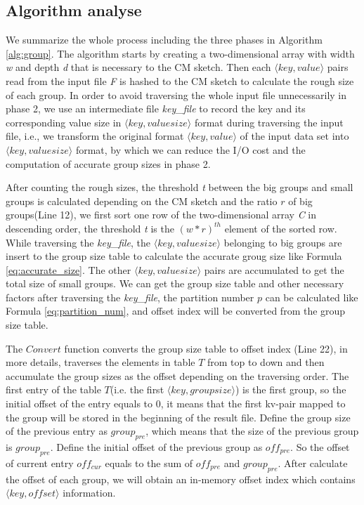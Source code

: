 \subsection{Algorithm analyse}
We summarize the whole process including the three phases in Algorithm \ref{alg:group}. The algorithm starts by creating a two-dimensional array with width \emph{w} and depth \emph{d} that is necessary to the CM sketch. Then each $\langle key, value\rangle$ pairs read from the input file \emph{F} is hashed to the CM sketch to calculate the rough size of each group. In order to avoid traversing the whole input file unnecessarily in phase 2, we use an intermediate file \emph{key\_file} to record the key and its corresponding value size in $\langle key, valuesize\rangle$ format during traversing the input file, i.e., we transform the original format $\langle key, value\rangle$ of the input data set into $\langle key, valuesize\rangle$ format, by which we can reduce the I/O cost and the computation of accurate group sizes in phase 2.

After counting the rough sizes, the threshold \emph{t} between the big groups and small groups is calculated depending on the CM sketch and the ratio $r$ of big groups(Line 12), we first sort one row of the two-dimensional array \emph{C} in descending order, the threshold \emph{t} is the ${(w*r)}^{th}$ element of the sorted row. While traversing the \emph{key\_file}, the $\langle key, valuesize\rangle$ belonging to big groups are insert to the group size table to calculate the accurate groug size like Formula \ref{eq:accurate_size}. The other $\langle key, valuesize\rangle$ pairs are accumulated to get the total size of small groups. We can get the group size table and other necessary factors after traversing the \emph{key\_file}, the partition number $p$ can be calculated like Formula \ref{eq:partition_num}, and offset index will be converted from the group size table.

The $Convert$ function converts the group size table to offset index (Line 22), in more details, traverses the elements in table $T$ from top to down and then accumulate the group sizes as the offset depending on the traversing order. The first entry of the table $T$(i.e. the first $\langle key, groupsize\rangle$) is the first group, so the initial offset of the entry equals to 0, it means that the first kv-pair mapped to the group will be stored in the beginning of the result file. Define the group size of the previous entry as $group_{pre}$, which means that the size of the previous group is $group_{pre}$. Define the initial offset of the previous group as ${off}_{pre}$. So the offset of current entry ${off}_{cur}$ equals to the sum of ${off}_{pre}$ and $group_{pre}$. After calculate the offset of each group, we will obtain an in-memory offset index which contains $\langle key,offset\rangle$ information. 

